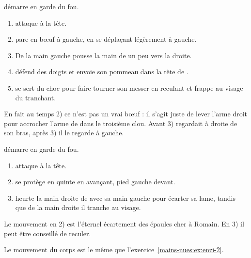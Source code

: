 \begin{technique}

\D démarre en garde du fou.

\begin{enumerate}
	\item \A attaque à la tête.
	\item \D pare en bœuf à gauche, en se déplaçant légèrement à gauche.
	\item De la main gauche \D pousse la main de \A un peu vers la droite.
	\item \D défend des doigts et envoie son pommeau dans la tête de \A.
	\item \D se sert du choc pour faire tourner son messer en reculant et frappe \A au visage du tranchant.
\end{enumerate}

En fait au temps 2) ce n'est pas un vrai bœuf : il s'agit juste de lever l'arme droit pour accrocher l'arme de \A dans le troisième clou.
Avant 3) \D regardait \A à droite de son bras, après 3) il le regarde à gauche.

\end{technique}


\begin{technique}

\D démarre en garde du fou.

\begin{enumerate}
	\item \A attaque à la tête.
	\item \D se protège en quinte en avançant, pied gauche devant.
	\item \D heurte la main droite de \A avec sa main gauche pour écarter sa lame, tandis que de la main droite il tranche au visage.
\end{enumerate}

Le mouvement en 2) est l'éternel écartement des épaules cher à Romain.
En 3) il peut être conseillé de reculer.

Le mouvement du corps est le même que l'exercice~\ref{mains-nues:ex:enzi-2}.

\end{technique}


